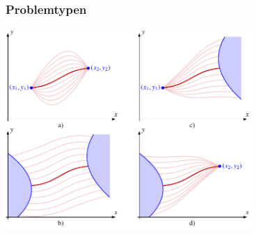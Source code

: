 %
%
%
\bgroup
\begin{frame}[t]
\setlength{\abovedisplayskip}{5pt}
\setlength{\belowdisplayskip}{5pt}
\frametitle{Problemtypen}
\vspace{-10pt}
\begin{center}
\includegraphics[width=0.7\textwidth]{../../buch/chapters/020-variation/images/grundaufgaben.pdf}
\end{center}
\end{frame}
\egroup
